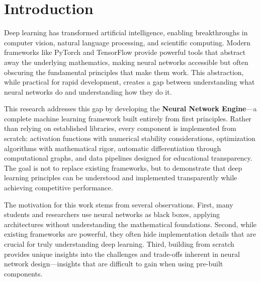 \documentclass[11pt,a4paper]{report}
\begin{document}
\begin{abstract}
\begin{otherlanguage*}{bulgarian}
Ключовите приноси включват числено стабилни реализации, автоматична диференциация за изчисляване на градиенти, модулна архитектура, която улеснява бързото експериментиране, и изчерпателни инструменти за следене на производителността. Системата убедително свързва теорията с практиката, прави сложните концепции на дълбокото обучение по-достъпни и предоставя надеждни средства за реални задачи по разпознаване на образи и класификация.
\end{otherlanguage*}
\endgroup
\end{abstract}

\tableofcontents
\newpage

\chapter{Introduction}

Deep learning has transformed artificial intelligence, enabling breakthroughs in computer vision, natural language processing, and scientific computing. Modern frameworks like PyTorch and TensorFlow provide powerful tools that abstract away the underlying mathematics, making neural networks accessible but often obscuring the fundamental principles that make them work. This abstraction, while practical for rapid development, creates a gap between understanding what neural networks do and understanding how they do it.

This research addresses this gap by developing the \textbf{Neural Network Engine}—a complete machine learning framework built entirely from first principles. Rather than relying on established libraries, every component is implemented from scratch: activation functions with numerical stability considerations, optimization algorithms with mathematical rigor, automatic differentiation through computational graphs, and data pipelines designed for educational transparency. The goal is not to replace existing frameworks, but to demonstrate that deep learning principles can be understood and implemented transparently while achieving competitive performance.

The motivation for this work stems from several observations. First, many students and researchers use neural networks as black boxes, applying architectures without understanding the mathematical foundations. Second, while existing frameworks are powerful, they often hide implementation details that are crucial for truly understanding deep learning. Third, building from scratch provides unique insights into the challenges and trade-offs inherent in neural network design—insights that are difficult to gain when using pre-built components.
\end{document}
